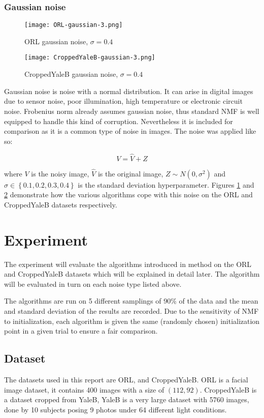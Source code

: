 \documentclass{article} %
\begin{document}
\subsubsection{Gaussian noise}
\begin{figure}
\texttt{[image: ORL-gaussian-3.png]}
\caption{ORL gaussian noise, $\sigma=0.4$ \label{fig:ORL-gaussian-3}}
\end{figure}
\begin{figure}
\texttt{[image: CroppedYaleB-gaussian-3.png]}
\caption{CroppedYaleB gaussian noise, $\sigma=0.4$ \label{fig:CroppedYaleB-gaussian-3}}
\end{figure}

Gaussian noise is noise with a normal distribution. It can arise in digital images due to sensor noise, poor illumination, high temperature or electronic circuit noise. \cite{gaussian} Frobenius norm already assumes gaussian noise, thus standard NMF is well equipped to handle this kind of corruption. Nevertheless it is included for comparison as it is a common type of noise in images. The noise was applied like so:

\begin{equation}
V = \hat{V} + Z
\end{equation}

where $V$ is the noisy image, $\hat{V}$ is the original image, $Z \sim N\left(0,\sigma^2\right)$ and $\sigma \in \left\{0.1,0.2,0.3,0.4\right\}$ is the standard deviation hyperparameter. Figures \ref{fig:ORL-gaussian-3} and \ref{fig:CroppedYaleB-gaussian-3} demonstrate how the various algorithms cope with this noise on the ORL and CroppedYaleB datasets respectively.

\section{Experiment}
The experiment will evaluate the algorithms introduced in method on the ORL and CroppedYaleB datasets which will be explained in detail later. The algorithm will be evaluated in turn on each noise type listed above.

The algorithms are run on 5 different samplings of 90\% of the data and the mean and standard deviation of the results are recorded. Due to the sensitivity of NMF to initialization, each algorithm is given the same (randomly chosen) initialization point in a given trial to ensure a fair comparison.

\subsection{Dataset}
The datasets used in this report are ORL, and CroppedYaleB. ORL is a facial image dataset, it contains 400 images with a size of $\left(112,92\right)$. CroppedYaleB is a dataset cropped from YaleB, YaleB is a very large dataset with 5760 images, done by 10 subjects posing 9 photos under 64 different light conditions.
\end{document}
